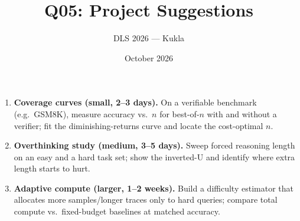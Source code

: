 \documentclass[11pt]{article}
\title{Q05: Project Suggestions}
\author{DLS 2026 --- Kukla}
\date{October 2026}
\begin{document}
\maketitle
\begin{enumerate}[leftmargin=1.5em]
\item \textbf{Coverage curves (small, 2--3 days).} On a verifiable benchmark (e.g.\ GSM8K), measure accuracy vs.\ $n$ for best-of-$n$ with and without a verifier; fit the diminishing-returns curve and locate the cost-optimal $n$.
\item \textbf{Overthinking study (medium, 3--5 days).} Sweep forced reasoning length on an easy and a hard task set; show the inverted-U and identify where extra length starts to hurt.
\item \textbf{Adaptive compute (larger, 1--2 weeks).} Build a difficulty estimator that allocates more samples/longer traces only to hard queries; compare total compute vs.\ fixed-budget baselines at matched accuracy.
\end{enumerate}
\end{document}
